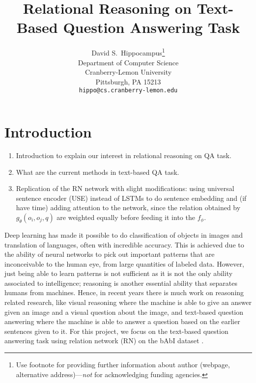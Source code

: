 \documentclass{article}
\title{Relational Reasoning on Text-Based Question Answering Task}
\author{
  David S.~Hippocampus\thanks{Use footnote for providing further
    information about author (webpage, alternative
    address)---\emph{not} for acknowledging funding agencies.} \\
  Department of Computer Science\\
  Cranberry-Lemon University\\
  Pittsburgh, PA 15213 \\
  \texttt{hippo@cs.cranberry-lemon.edu} \\
}
\begin{document}

\maketitle



\section{Introduction}
\begin{enumerate}
\item Introduction to explain our interest in relational reasoning on QA task. 

\item What are the current methods in text-based QA task. 
\item Replication of the RN network with slight modifications: using universal sentence encoder (USE) instead of LSTMs to do sentence embedding and (if have time) adding attention to the network, since the relation obtained by $g_\theta(o_i,o_j,q)$ are weighted equally before feeding it into the $f_\phi$.
\end{enumerate}

	Deep learning has made it possible to do classification of objects in images and translation of languages, often with incredible accuracy. This is achieved due to the ability of neural networks to pick out important patterns that are inconceivable to the human eye, from large quantities of labeled data. However, just being able to learn patterns is not sufficient as it is not the only ability associated to intelligence; reasoning is another essential ability \cite{Bottou2011} that separates humans from machines. Hence, in recent years there is much work on reasoning related research, like visual reasoning \cite{Johnson2017, Santoro2017} where the machine is able to give an answer given an image and a visual question about the image, and text-based question answering \cite{Santoro2017} where the machine is able to answer a question based on the earlier sentences given to it. For this project, we focus on the text-based question answering task using relation network (RN) \cite{Santoro2017} on the bAbI dataset \cite{Weston2015}.
\end{document}
